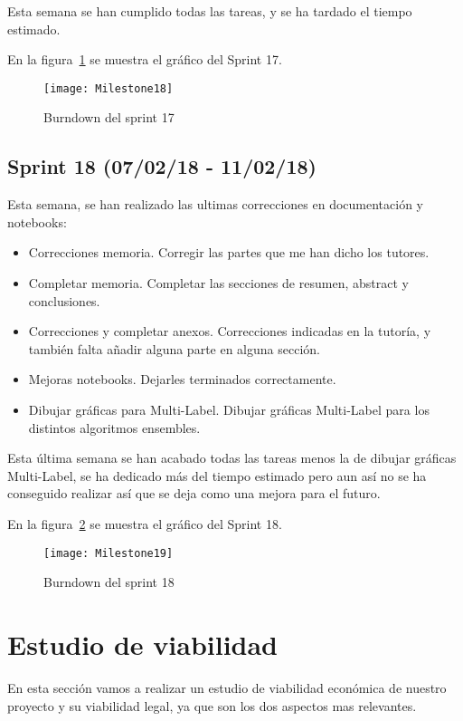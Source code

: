 Esta semana se han cumplido todas las tareas, y se ha tardado el tiempo estimado.

En la figura~\ref{fig:Milestone18} se muestra el gráfico del Sprint 17.

\begin{figure}
\centering
\texttt{[image: Milestone18]}
\caption{Burndown del sprint 17}
\label{fig:Milestone18}
\end{figure}

\subsection{Sprint 18 (07/02/18 - 11/02/18)}
Esta semana, se han realizado las ultimas correcciones en documentación y notebooks:
\begin{itemize}
\item Correcciones memoria. Corregir las partes que me han dicho los tutores.
\item Completar memoria. Completar las secciones de resumen, abstract y conclusiones.
\item Correcciones y completar anexos. Correcciones indicadas en la tutoría, y también falta añadir alguna parte en alguna sección.
\item Mejoras notebooks. Dejarles terminados correctamente.
\item Dibujar gráficas para Multi-Label. Dibujar gráficas Multi-Label para los distintos algoritmos ensembles.
\end{itemize}

Esta última semana se han acabado todas las tareas menos la de dibujar gráficas Multi-Label, se ha dedicado más del tiempo estimado pero aun así no se ha conseguido realizar así que se deja como una mejora para el futuro.

En la figura~\ref{fig:Milestone19} se muestra el gráfico del Sprint 18.

\begin{figure}
\centering
\texttt{[image: Milestone19]}
\caption{Burndown del sprint 18}
\label{fig:Milestone19}
\end{figure}

\section{Estudio de viabilidad}
En esta sección vamos a realizar un estudio de viabilidad económica de nuestro proyecto y su viabilidad legal, ya que son los dos aspectos mas relevantes.
